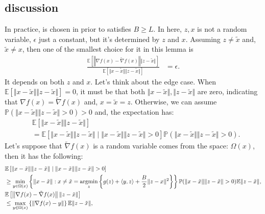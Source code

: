 \documentclass[12pt]{article}
\newcommand{\expect}{\ensuremath{\mathbb E}}
\newcommand{\prob}{\ensuremath{\mathbb P}}
\begin{document}
    \subsection{discussion}
        In practice, is chosen in prior to satisfies $B \ge L$. 
        In here, $z, x$ is not a random variable, $\epsilon$ just a constant, but it's determined by $z$ and $x$. 
        Assuming $z \neq \tilde x$ and, $\tilde x \neq x$, then one of the smallest choice for it in this lemma is
        \begin{align}\label{eqn:stoch-grad-epsilon}
            \frac{
                \expect \left[
                    \left\Vert \nabla f(x) - \tilde \nabla f(x) \right\Vert \Vert z - \tilde x\Vert
                \right]
            }{
            \expect \left[
                \Vert x - \tilde x\Vert\Vert z - \tilde x\Vert
            \right]
            } &= \epsilon. 
        \end{align}
        It depends on both $z$ and $x$. 
        Let's think about the edge case. 
        When $\expect [\Vert x - \tilde x\Vert\Vert z - \tilde x\Vert] = 0$, it must be that both $\Vert x - \tilde x\Vert,\Vert z - \tilde x\Vert$ are zero, indicating that $\nabla f(x) = \tilde \nabla f(x)$ and, $x = \tilde x = z$. 
        Otherwise, we can assume $\prob(\Vert x - \tilde x\Vert\Vert z - \tilde x\Vert > 0) > 0$ and, the expectation has: 
        \begin{align*}
            & \expect \left[
                \Vert x - \tilde x\Vert\Vert z - \tilde x\Vert
            \right] 
            \\&= 
            \expect\left[
                \Vert x - \tilde x\Vert\Vert z - \tilde x\Vert \;|\; 
                \Vert x - \tilde x\Vert\Vert z - \tilde x\Vert > 0
            \right]\prob(
                \Vert x - \tilde x\Vert\Vert z - \tilde x\Vert > 0
            ). 
        \end{align*}
        Let's suppose that $\tilde \nabla f(x)$ is a random variable comes from the space: $\Omega(x)$, then it has the following: 
        {\small
        \begin{align*}
            & \expect \left[
                \Vert x - \tilde x\Vert\Vert z - \tilde x\Vert \; | \; 
                \Vert x - \tilde x\Vert\Vert z - \tilde x\Vert > 0
            \right] 
            \\
            &\ge
            \min_{y \in \Omega(x)}\left\lbrace
                \Vert x - \tilde x\Vert
                :x\neq \tilde x = \argmin_{z}\left\lbrace
                    g(z) + \langle y, z\rangle + \frac{B}{2}\Vert z - x\Vert^2
                \right\rbrace
            \right\rbrace
            \prob(
                \Vert x - \tilde x\Vert\Vert z - \tilde x\Vert > 0
            )
            \expect\Vert z - \tilde x\Vert, 
            \\
            & \expect \left[
                \left\Vert \nabla f(x) - \tilde \nabla f(x) \right\Vert \Vert z - \tilde x\Vert
            \right]
            \\
            &\le 
            \max_{y \in \Omega(x)}\left\lbrace
                \Vert \nabla f(x) - y\Vert 
            \right\rbrace\expect\Vert z - \tilde x \Vert, 
        \end{align*}
        }
\end{document}
